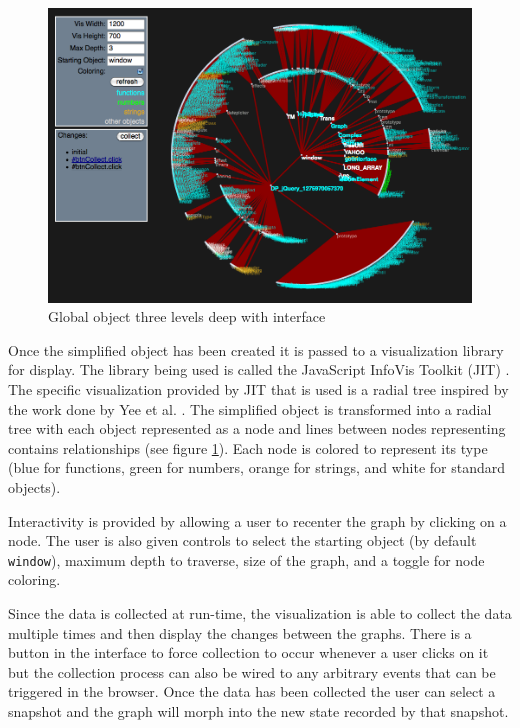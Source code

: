 \documentclass[]{article}
\begin{document}
\begin{figure}[h]
  \begin{center}
    \includegraphics[scale=.2]{interface.png}
  \end{center}
  \caption{Global object three levels deep with interface}
  \label{fig:interface}
\end{figure}


Once the simplified object has been created it is passed to a visualization library for display. The library being used is called the JavaScript InfoVis Toolkit (JIT) \cite{jit}. The specific visualization provided by JIT that is used is a radial tree inspired by the work done by Yee et al. \cite{yee2001animated}. The simplified object is transformed into a radial tree with each object represented as a node and lines between nodes representing contains relationships (see figure \ref{fig:interface}). Each node is colored to represent its type (blue for functions, green for numbers, orange for strings, and white for standard objects). 

Interactivity is provided by allowing a user to recenter the graph by clicking on a node. The user is also given controls to select the starting object (by default {\tt window}), maximum depth to traverse, size of the graph, and a toggle for node coloring. 

Since the data is collected at run-time, the visualization is able to collect the data multiple times and then display the changes between the graphs. There is a button in the interface to force collection to occur whenever a user clicks on it but the collection process can also be wired to any arbitrary events that can be triggered in the browser. Once the data has been collected the user can select a snapshot and the graph will morph into the new state recorded by that snapshot.
\end{document}
